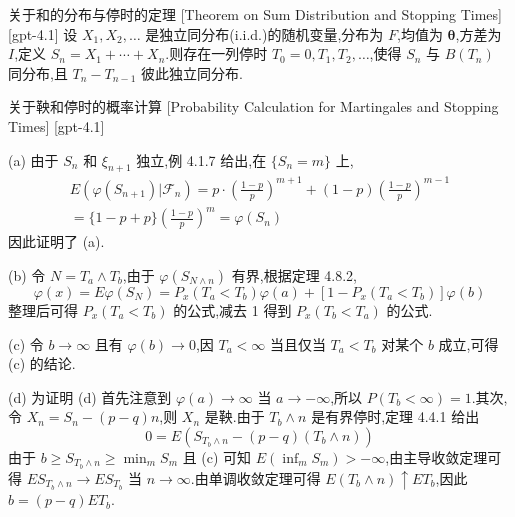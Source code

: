 \documentclass[UTF8]{ctexart}
\begin{document}
    
    
    \begin{thm}
        {关于和的分布与停时的定理}
        [Theorem on Sum Distribution and Stopping Times]
        [gpt-4.1]
        设 $X_1, X_2, \ldots$ 是独立同分布(i.i.d.)的随机变量,分布为 $F$,均值为 $\boldsymbol{\theta}$,方差为 $I$,定义 $S_n = X_1 + \cdots + X_n$.则存在一列停时 $T_0 = 0, T_1, T_2, \dots$,使得 $S_n$ 与 $B(T_n)$ 同分布,且 $T_n - T_{n-1}$ 彼此独立同分布.

    \end{thm}
    
    
    
    \begin{thm}
        {关于鞅和停时的概率计算}
        [Probability Calculation for Martingales and Stopping Times]
        [gpt-4.1]
        
(a) 由于 $S_n$ 和 $\xi_{n+1}$ 独立,例 4.1.7 给出,在 $\{S_n = m\}$ 上,
\[
\begin{array}{l}
\displaystyle E(\varphi(S_{n+1}) | \mathcal{F}_n) = p \cdot \left( \frac{1 - p}{p} \right)^{m+1} + (1 - p) \left( \frac{1 - p}{p} \right)^{m-1} \\
\displaystyle = \{1 - p + p\} \left( \frac{1 - p}{p} \right)^m = \varphi(S_n)
\end{array}
\]
因此证明了 (a).

(b) 令 $N = T_a \land T_b$,由于 $\varphi(S_{N \wedge n})$ 有界,根据定理 4.8.2,
\[
\varphi(x) = E \varphi(S_N) = P_x(T_a < T_b) \varphi(a) + [1 - P_x(T_a < T_b)] \varphi(b)
\]
整理后可得 $P_x(T_a < T_b)$ 的公式,减去 1 得到 $P_x(T_b < T_a)$ 的公式.

(c) 令 $b \to \infty$ 且有 $\varphi(b) \to 0$,因 $T_a < \infty$ 当且仅当 $T_a < T_b$ 对某个 $b$ 成立,可得 (c) 的结论.

(d) 为证明 (d) 首先注意到 $\varphi(a) \to \infty$ 当 $a \to -\infty$,所以 $P(T_b < \infty) = 1$.其次,令 $X_n = S_n - (p - q)n$,则 $X_n$ 是鞅.由于 $T_b \land n$ 是有界停时,定理 4.4.1 给出
\[
0 = E \left( S_{T_b \wedge n} - (p - q)(T_b \wedge n) \right)
\]
由于 $b \geq S_{T_b \wedge n} \geq \min_m S_m$ 且 (c) 可知 $E(\inf_m S_m) > -\infty$,由主导收敛定理可得 $E S_{T_b \wedge n} \to E S_{T_b}$ 当 $n \to \infty$.由单调收敛定理可得 $E(T_b \land n) \uparrow E T_b$,因此 $b = (p - q) E T_b$.

    \end{thm}
    
    
    
\end{document}

